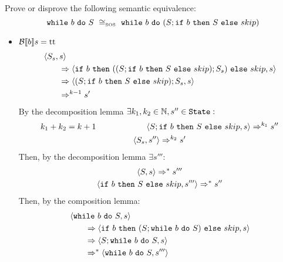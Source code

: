\begin{exercise}{
    Prove or disprove the following semantic equivalence:
    \[ \wwhile{b}{S}\ \cong_{\text{\tiny SOS}}\ \wwhile{b}{(S;\wif{b}{S}{skip})} \]
}
\begin{itemize}
\begin{itemize}
\begin{itemize}
\begin{align*}
                                &\instr{\wwhile{b}{S}}{s}
                                \\&\qquad\Rightarrow \instr{\wif{b}{(S; \wwhile{b}{S})}{skip}}{s}
                                \\&\qquad\Rightarrow \instr{skip}{s}
                                \\&\qquad\Rightarrow s
                            \end{align*}
                        \item $\mathcal{B} \llbracket b \rrbracket s = \text{tt}$
                            \begin{align*}
                                &\left<S_s, s\right>
                                \\&\qquad\Rightarrow \left<\texttt{if}\ b\ \texttt{then}\ ((S;\texttt{if}\ b\ \texttt{then}\ S\ \texttt{else}\ skip);S_s)\ \texttt{else}\ skip, s\right>
                                \\&\qquad\Rightarrow \left<(S;\texttt{if}\ b\ \texttt{then}\ S\ \texttt{else}\ skip);S_s, s\right>
                                \\&\qquad\Rightarrow^{k - 1} s'
                            \end{align*}
                            By the decomposition lemma $\exists k_1, k_2 \in \mathbb{N}, s'' \in \texttt{State} :$
                            \begin{gather*}
                                k_1 + k_2 = k + 1 \qquad\qquad\qquad \left<S;\texttt{if}\ b\ \texttt{then}\ S\ \texttt{else}\ skip, s\right> \Rightarrow^{k_1} s'' \\
                                \left<S_s, s''\right> \Rightarrow^{k_2} s'
                            \end{gather*}
                            Then, by the decomposition lemma $\exists s''' :$
                            \begin{gather*}
                                \left<S, s\right> \Rightarrow^* s''' \\
                                \left<\texttt{if}\ b\ \texttt{then}\ S\ \texttt{else}\ skip, s'''\right> \Rightarrow^* s''
                            \end{gather*}
                            Then, by the composition lemma:
                            \begin{align*}
                                &\instr{\wwhile{b}{S}}{s}
                                \\&\qquad\Rightarrow \instr{\wif{b}{(S; \wwhile{b}{S})}{skip}}{s}
                                \\&\qquad\Rightarrow \instr{S; \wwhile{b}{S}}{s}
                                \\&\qquad\Rightarrow^* \instr{\wwhile{b}{S}}{s'''}

\end{align*}
\end{itemize}
\end{itemize}
\end{itemize}
\end{exercise}
